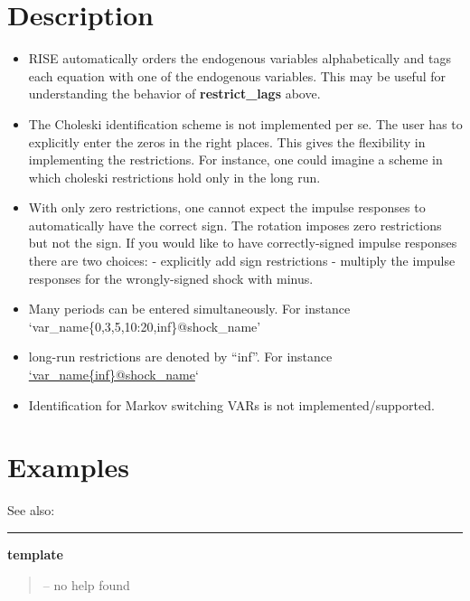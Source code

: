 \documentclass[letterpaper,10pt,english]{sphinxmanual}
\begin{document}
\section{Description}
\label{classes/models/@rfvar/rfvar:id146}\begin{itemize}
\item {} 
RISE automatically orders the endogenous variables alphabetically and
tags each equation with one of the endogenous variables. This may be
useful for understanding the behavior of \textbf{restrict\_lags} above.

\item {} 
The Choleski identification scheme is not implemented per se. The user
has to explicitly enter the zeros in the right places. This gives the
flexibility in implementing the restrictions. For instance, one could
imagine a scheme in which choleski restrictions hold only in the long
run.

\item {} 
With only zero restrictions, one cannot expect the impulse responses to
automatically have the correct sign. The rotation imposes zero
restrictions but not the sign. If you would like to have
correctly-signed impulse responses there are two choices:
- explicitly add sign restrictions
- multiply the impulse responses for the wrongly-signed shock with
minus.

\item {} 
Many periods can be entered simultaneously. For instance
`var\_name\{0,3,5,10:20,inf\}@shock\_name'

\item {} 
long-run restrictions are denoted by ``inf''. For instance
\href{mailto:'var\_name\{inf\}@shock\_name}{`var\_name\{inf\}@shock\_name}`

\item {} 
Identification for Markov switching VARs is not implemented/supported.

\end{itemize}


\section{Examples}
\label{classes/models/@rfvar/rfvar:id147}
See also:


\bigskip\hrule{}\bigskip

\label{classes/models/@rfvar/rfvar:template}
\textbf{template}
\begin{quote}

-- no help found
\end{quote}
\end{document}
